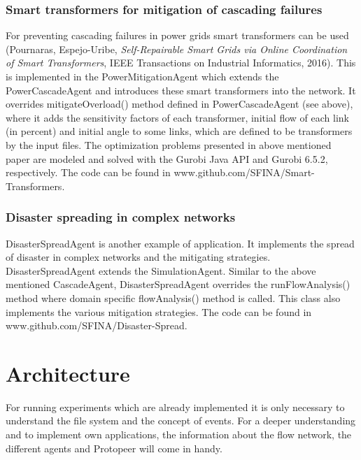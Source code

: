 \documentclass[11pt,fleqn]{book} %
\begin{document}
\subsection{Smart transformers for mitigation of cascading failures}
For preventing cascading failures in power grids smart transformers can be used (Pournaras, Espejo-Uribe, \textit{Self-Repairable Smart Grids via Online Coordination of Smart Transformers}, IEEE Transactions on Industrial Informatics, 2016). This is implemented in the PowerMitigationAgent which extends the PowerCascadeAgent and introduces these smart transformers into the network. It overrides mitigateOverload() method defined in PowerCascadeAgent (see above), where it adds the sensitivity factors of each transformer, initial flow of each link (in percent) and initial angle to some links, which are defined to be transformers by the input files. The optimization problems presented in above mentioned paper are modeled and solved with the Gurobi Java API and Gurobi 6.5.2, respectively. The code can be found in www.github.com/SFINA/Smart-Transformers.

\subsection{Disaster spreading in complex networks}
DisasterSpreadAgent is another example of application. It implements the spread of disaster in complex networks and the mitigating strategies. DisasterSpreadAgent extends the SimulationAgent. Similar to the above mentioned CascadeAgent, DisasterSpreadAgent overrides the runFlowAnalysis() method where domain specific flowAnalysis() method is called. This class also implements the various mitigation strategies. The code can be found in www.github.com/SFINA/Disaster-Spread.



\chapter{Architecture}
\label{ch:architecture}

For running experiments which are already implemented it is only necessary to understand the file system and the concept of events. For a deeper understanding and to implement own applications, the information about the flow network, the different agents and Protopeer will come in handy. 
\end{document}
